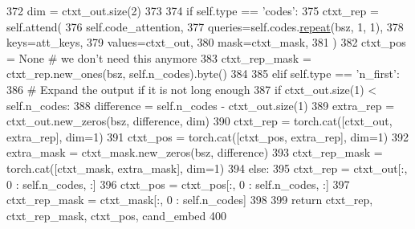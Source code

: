 \begin{DoxyCode}
372             dim = ctxt\_out.size(2)
373 
374             \textcolor{keywordflow}{if} self.type == \textcolor{stringliteral}{'codes'}:
375                 ctxt\_rep = self.attend(
376                     self.code\_attention,
377                     queries=self.codes.\hyperlink{namespacerepeat}{repeat}(bsz, 1, 1),
378                     keys=att\_keys,
379                     values=ctxt\_out,
380                     mask=ctxt\_mask,
381                 )
382                 ctxt\_pos = \textcolor{keywordtype}{None}  \textcolor{comment}{# we don't need this anymore}
383                 ctxt\_rep\_mask = ctxt\_rep.new\_ones(bsz, self.n\_codes).byte()
384 
385             \textcolor{keywordflow}{elif} self.type == \textcolor{stringliteral}{'n\_first'}:
386                 \textcolor{comment}{# Expand the output if it is not long enough}
387                 \textcolor{keywordflow}{if} ctxt\_out.size(1) < self.n\_codes:
388                     difference = self.n\_codes - ctxt\_out.size(1)
389                     extra\_rep = ctxt\_out.new\_zeros(bsz, difference, dim)
390                     ctxt\_rep = torch.cat([ctxt\_out, extra\_rep], dim=1)
391                     ctxt\_pos = torch.cat([ctxt\_pos, extra\_rep], dim=1)
392                     extra\_mask = ctxt\_mask.new\_zeros(bsz, difference)
393                     ctxt\_rep\_mask = torch.cat([ctxt\_mask, extra\_mask], dim=1)
394                 \textcolor{keywordflow}{else}:
395                     ctxt\_rep = ctxt\_out[:, 0 : self.n\_codes, :]
396                     ctxt\_pos = ctxt\_pos[:, 0 : self.n\_codes, :]
397                     ctxt\_rep\_mask = ctxt\_mask[:, 0 : self.n\_codes]
398 
399         \textcolor{keywordflow}{return} ctxt\_rep, ctxt\_rep\_mask, ctxt\_pos, cand\_embed
400 
\end{DoxyCode}
\mbox{\label{classparlai_1_1agents_1_1transformer_1_1polyencoder_1_1PolyEncoderModule_a9e769210d947e88dc3e4555583b9c82e}} 
